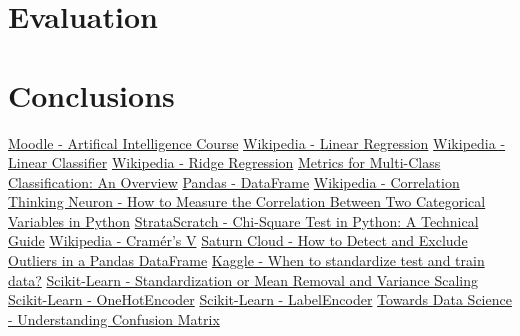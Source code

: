 \documentclass[runningheads]{paper}
\begin{document}
\section{Evaluation}

\section{Conclusions}


\pagebreak

\begin{thebibliography}{8}
    \bibitem{}
    \href{https://curs.upb.ro/2023/course/view.php?id=13749}{Moodle - Artifical Intelligence Course}
    \bibitem{}
    \href{https://en.wikipedia.org/wiki/Linear_regression}{Wikipedia - Linear Regression}
    \bibitem{}
    \href{https://en.wikipedia.org/wiki/Linear_classifier}{Wikipedia - Linear Classifier}
    \bibitem{}
    \href{https://en.wikipedia.org/wiki/Ridge_regression}{Wikipedia - Ridge Regression}
    \bibitem{}
    \href{https://www.semanticscholar.org/reader/2c9022fe0af15568a885e59d475ec8f95726e51b}{Metrics for Multi-Class Classification: An Overview}
    \bibitem{}
    \href{https://pandas.pydata.org/docs/reference/api/pandas.DataFrame.html}{Pandas - DataFrame}
    \bibitem{}
    \href{https://en.wikipedia.org/wiki/Correlation}{Wikipedia - Correlation}
    \bibitem{}
    \href{https://thinkingneuron.com/how-to-measure-the-correlation-between-two-categorical-variables-in-python/}{Thinking Neuron - How to Measure the Correlation Between Two Categorical Variables in Python}
    \bibitem{}
    \href{https://www.stratascratch.com/blog/chi-square-test-in-python-a-technical-guide/}{StrataScratch - Chi-Square Test in Python: A Technical Guide}
    \bibitem{}
    \href{https://en.wikipedia.org/wiki/Cram\%C3\%A9r\%27s\_V}{Wikipedia - Cramér's V}
    \bibitem{}
    \href{https://saturncloud.io/blog/how-to-detect-and-exclude-outliers-in-a-pandas-dataframe/}{Saturn Cloud - How to Detect and Exclude Outliers in a Pandas DataFrame}
    \bibitem{}
    \href{https://www.kaggle.com/discussions/questions-and-answers/159183}{Kaggle - When to standardize test and train data?}
    \bibitem{}
    \href{https://scikit-learn.org/stable/modules/preprocessing.html#standardization-or-mean-removal-and-variance-scaling}{Scikit-Learn - Standardization or Mean Removal and Variance Scaling}
    \bibitem{}
    \href{https://scikit-learn.org/stable/modules/generated/sklearn.preprocessing.OneHotEncoder.html}{Scikit-Learn - OneHotEncoder}
    \bibitem{}
    \href{https://scikit-learn.org/stable/modules/generated/sklearn.preprocessing.LabelEncoder.html}{Scikit-Learn - LabelEncoder}
    \bibitem{}
    \href{https://towardsdatascience.com/understanding-confusion-matrix-a9ad42dcfd62}{Towards Data Science - Understanding Confusion Matrix}
    
    \end{thebibliography}
\end{document}
